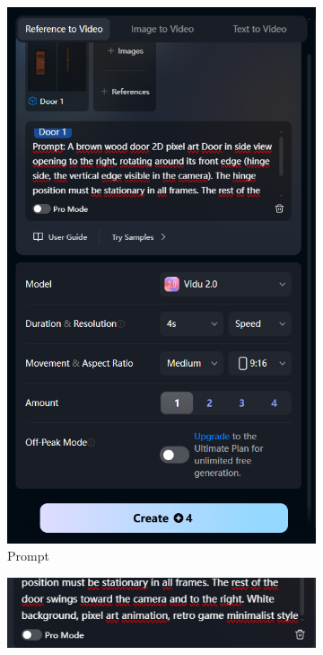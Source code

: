 \begin{figure}[htbp]
    \centering
    \caption{\small Processo de geração da animação 1 da porta no Vidu }
    \label{fig:viduPorta1}
    \begin{subfigure}{0.42\linewidth}
        \includegraphics[width=1\linewidth]{figs/vidu/porta_tela1.PNG}
        \caption{\small Prompt}
        \label{fig:viduPorta1a}
    \end{subfigure}
    \begin{subfigure}{0.42\linewidth}
        \includegraphics[width=1\linewidth]{figs/vidu/porta_tela2.PNG}

\end{subfigure}
\end{figure}
